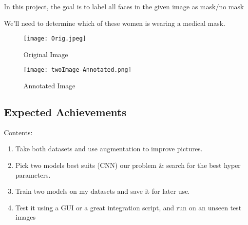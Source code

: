 In this project, the goal is to label all faces in the given image as mask/no mask

We'll need to determine which of these women is wearing a medical mask.

\begin{figure}[H]
    \centering
    \texttt{[image: Orig.jpeg]}
    \caption{Original Image}
    \label{fig:Orig}
\end{figure}


\begin{figure}[H]
    \centering
    \texttt{[image: twoImage-Annotated.png]}
    \caption{Annotated Image}
    \label{fig:Annotated}
\end{figure}

\subsection{Expected Achievements}
Contents:
\begin{enumerate}
  \item Take both datasets and use augmentation to improve pictures.
  \item Pick two models best suits (CNN) our problem \& search for the best hyper parameters.
  \item Train two models on my datasets and save it for later use.
  \item Test it using a GUI or a great integration script, and run on an unseen test images
\end{enumerate}

